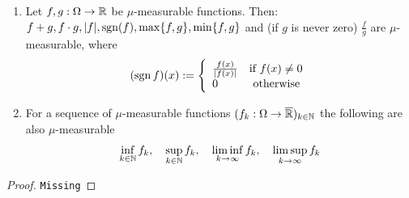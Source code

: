 \begin{thm}[]
\phantom{a}
\begin{enumerate}
  \item Let $f,g: \Omega \to  \mathbb{R}$ be $\mu$-measurable functions. Then:
    $f + g, f \cdot g, \vert f\vert, \operatorname{sgn}(f), \max\{f,g\}, \min \{f,g\}$ and (if $g$ is never zero) $\frac{f}{g}$ are $\mu$-measurable, where
    \begin{align*}
      (\operatorname{sgn} f)(x) := \left\{\begin{array}{ll}
          \frac{f(x)}{\vert f(x)\vert} & \text{if } f(x) \neq 0\\
        0 & \text{ otherwise}
      \end{array} \right.
    \end{align*}
  \item For a sequence of $\mu$-measurable functions $(f_k: \Omega \to  \overline{\mathbb{R}})_{k \in \mathbb{N}}$ the following are also $\mu$-measurable
    \begin{align*}
      \inf_{k \in \mathbb{N}} f_k, \quad
      \sup_{k \in \mathbb{N}} f_k, \quad
      \liminf_{k \to  \infty} f_k, \quad
      \limsup_{k \to \infty} f_k 
    \end{align*}
\end{enumerate}
\end{thm}
\begin{proof}
\texttt{Missing}
\end{proof}



